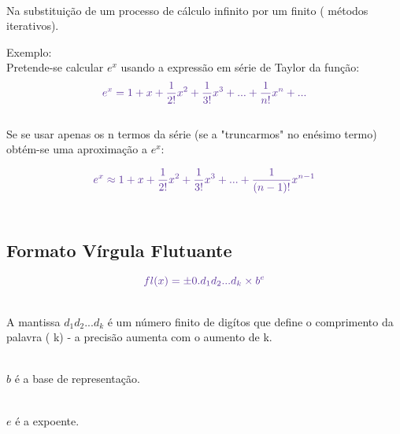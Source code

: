 \documentclass[12pt, a4paper, titlepage, oneside, dvipsnames]{report}
\begin{document}
        \begin{paragraph}\\
        Na substituição de um processo de cálculo infinito por um finito ({\color{Mahogany} métodos iterativos}).
        \end{paragraph}

        \begin{paragraph}{\color{OliveGreen} Exemplo}:\\
        Pretende-se calcular {\color{RoyalPurple} $e^x$} usando a expressão em série de Taylor da função:\\
        \[
            \color{RoyalPurple}
            e^x = 1 + x + \frac{1}{2!}x^2 + \frac{1}{3!}x^3 + ... + \frac{1}{n!}x^n + ...  
        \]\\
        Se se usar apenas os {\color{RoyalPurple} n} termos da série (se a "truncarmos" no {\color{RoyalPurple} enésimo} termo)
         obtém-se uma aproximação a {\color{RoyalPurple} $e^x$}:

        \[
            \color{RoyalPurple}
            e^x \approx 1 + x + \frac{1}{2!}x^2 + \frac{1}{3!}x^3 + ... + \frac{1}{(n-1)!}x^{n-1}  
        \]\\
        \end{paragraph}

    \subsection{\color{RoyalPurple} Formato Vírgula Flutuante}

        \[
            \color{RoyalPurple}
            fl(x) = \pm 0.d_1d_2...d_k \times b^e
        \]

        \begin{paragraph}\\
        A mantissa {\color{RoyalPurple} \(d_1d_2...d_k\)} é um número finito de digítos que define o comprimento da palavra ({\color{RoyalPurple} k})
         - a precisão aumenta com o aumento de {\color{RoyalPurple} k}.
        \end{paragraph}

        \begin{paragraph}\\
        {\color{RoyalPurple} \(b\)} é a base de representação.
        \end{paragraph}
        \begin{paragraph}\\
        {\color{RoyalPurple} \(e\)} é a expoente.
        \end{paragraph}
\end{document}
